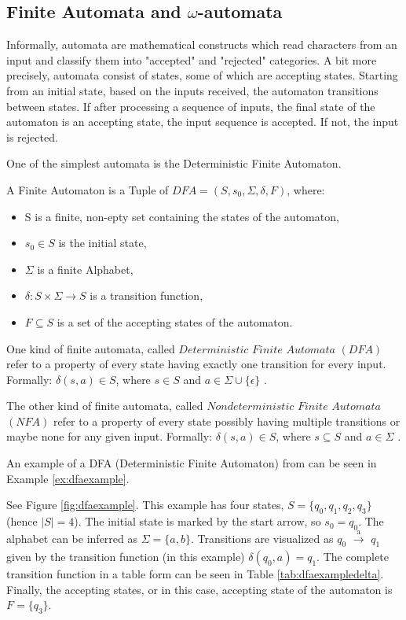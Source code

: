 \subsection{Finite Automata and $\omega$-automata} \label{ss:automata}

Informally, automata are mathematical constructs which read characters from an input and classify them into "accepted" and "rejected" categories. A bit more precisely, automata consist of states, some of which are accepting states. Starting from an initial state, based on the inputs received, the automaton transitions between states. If after processing a sequence of inputs, the final state of the automaton is an accepting state, the input sequence is accepted. If not, the input is rejected.

One of the simplest automata is the Deterministic Finite Automaton.

\begin{definition}
	A Finite Automaton is a Tuple of $ DFA=(S,s_{0},\Sigma,\delta,F) $, where: 
	\begin{itemize}
		\item S is a finite, non-epty set containing the states of the automaton,
		\item $s_{0} \in S$ is the initial state,
		\item $\Sigma$ is a finite Alphabet,
		\item $\delta: S\times \Sigma \to S$ is a transition function,
		\item $F\subseteq S$ is a set of the accepting states of the automaton. 
	\end{itemize}
\end{definition}

One kind of finite automata, called $Deterministic$ $Finite$ $Automata$ $(DFA)$ refer to a property of every state having exactly one transition for every input. Formally: $\delta (s,a) \in S$, where $s \in S$ and $a \in \Sigma \cup \{\epsilon\}$ .

The other kind of finite automata, called $Nondeterministic$ $Finite$ $Automata$ $(NFA)$ refer to a property of every state possibly having multiple transitions or maybe none for any given input. Formally: $\delta (s,a) \in S$, where $s \subseteq S$ and $a \in \Sigma$ .

An example of a DFA (Deterministic Finite Automaton) from\cite{Steffen2011} can be seen in Example \ref{ex:dfaexample}.

\begin{example}
	\label{ex:dfaexample}
	See Figure \ref{fig:dfaexample}. This example has four states, $S = \{q_0, q_1, q_2, q_3\}$ (hence $|S| = 4$). The initial state is marked by the start arrow, so $s_0 = q_0$. The alphabet can be inferred as $\Sigma = \{a, b\}$. Transitions are visualized as $q_0$ $\xrightarrow[]{\text{a}}$ $q_1$ given by the transition function (in this example) $\delta(q_0, a) = q_1$. The complete transition function in a table form can be seen in Table \ref{tab:dfaexampledelta}. Finally, the accepting states, or in this case, accepting state of the automaton is $F = \{q_3\}$.
\end{example}


